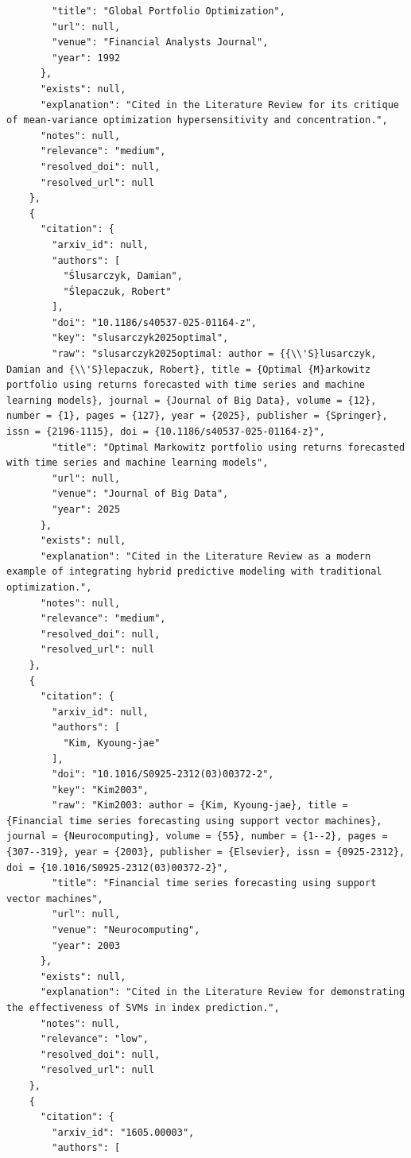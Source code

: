 \documentclass[11pt]{article}
\begin{document}
\begin{verbatim}
        "title": "Global Portfolio Optimization",
        "url": null,
        "venue": "Financial Analysts Journal",
        "year": 1992
      },
      "exists": null,
      "explanation": "Cited in the Literature Review for its critique of mean-variance optimization hypersensitivity and concentration.",
      "notes": null,
      "relevance": "medium",
      "resolved_doi": null,
      "resolved_url": null
    },
    {
      "citation": {
        "arxiv_id": null,
        "authors": [
          "Ślusarczyk, Damian",
          "Ślepaczuk, Robert"
        ],
        "doi": "10.1186/s40537-025-01164-z",
        "key": "slusarczyk2025optimal",
        "raw": "slusarczyk2025optimal: author = {{\\'S}lusarczyk, Damian and {\\'S}lepaczuk, Robert}, title = {Optimal {M}arkowitz portfolio using returns forecasted with time series and machine learning models}, journal = {Journal of Big Data}, volume = {12}, number = {1}, pages = {127}, year = {2025}, publisher = {Springer}, issn = {2196-1115}, doi = {10.1186/s40537-025-01164-z}",
        "title": "Optimal Markowitz portfolio using returns forecasted with time series and machine learning models",
        "url": null,
        "venue": "Journal of Big Data",
        "year": 2025
      },
      "exists": null,
      "explanation": "Cited in the Literature Review as a modern example of integrating hybrid predictive modeling with traditional optimization.",
      "notes": null,
      "relevance": "medium",
      "resolved_doi": null,
      "resolved_url": null
    },
    {
      "citation": {
        "arxiv_id": null,
        "authors": [
          "Kim, Kyoung-jae"
        ],
        "doi": "10.1016/S0925-2312(03)00372-2",
        "key": "Kim2003",
        "raw": "Kim2003: author = {Kim, Kyoung-jae}, title = {Financial time series forecasting using support vector machines}, journal = {Neurocomputing}, volume = {55}, number = {1--2}, pages = {307--319}, year = {2003}, publisher = {Elsevier}, issn = {0925-2312}, doi = {10.1016/S0925-2312(03)00372-2}",
        "title": "Financial time series forecasting using support vector machines",
        "url": null,
        "venue": "Neurocomputing",
        "year": 2003
      },
      "exists": null,
      "explanation": "Cited in the Literature Review for demonstrating the effectiveness of SVMs in index prediction.",
      "notes": null,
      "relevance": "low",
      "resolved_doi": null,
      "resolved_url": null
    },
    {
      "citation": {
        "arxiv_id": "1605.00003",
        "authors": [

\end{verbatim}
\end{document}

